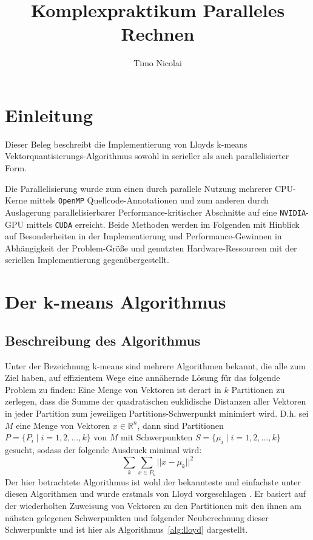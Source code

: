 \documentclass[
    bibliography=totoc, cd=lightcolor, cdmath=false, ngerman]{tudscrreprt}
\begin{document}
\title{Komplexpraktikum Paralleles Rechnen}

\author{
  Timo Nicolai
}


\headingsvskip=-100pt

\maketitle
\tableofcontents
\pagebreak

\chapter{Einleitung}
Dieser Beleg beschreibt die Implementierung von Lloyds k-means
Vektorquantisierungs-Algorithmus sowohl in serieller als auch parallelisierter
Form.

Die Parallelisierung wurde zum einen durch parallele Nutzung mehrerer CPU-Kerne
mittels \texttt{OpenMP} Quellcode-Annotationen und zum anderen durch
Auslagerung parallelisierbarer Performance-kritischer Abschnitte auf eine
\texttt{NVIDIA}-GPU mittels \texttt{CUDA} erreicht. Beide Methoden werden im
Folgenden mit Hinblick auf Besonderheiten in der Implementierung und
Performance-Gewinnen in Abhängigkeit der Problem-Größe und genutzten
Hardware-Ressourcen mit der seriellen Implementierung gegenübergestellt.

\chapter{Der k-means Algorithmus}

\section{Beschreibung des Algorithmus}

Unter der Bezeichnung k-means sind mehrere Algorithmen bekannt, die alle zum
Ziel haben, auf effizientem Wege eine annähernde Lösung für das folgende Problem
zu finden:
\bigbreak
Eine Menge von Vektoren ist derart in $k$ Partitionen zu zerlegen, dass die
Summe der quadratischen euklidische Distanzen aller Vektoren in jeder Partition
zum jeweiligen Partitions-Schwerpunkt minimiert wird. D.h. sei $M$ eine Menge
von Vektoren $x \in \mathbb{R}^n$, dann sind Partitionen $P = \{P_i \mid i =
1,2,\dots,k\}$ von $M$ mit Schwerpunkten $S = \{\mu_i \mid i = 1, 2, \dots,
k\}$ gesucht, sodass der folgende Ausdruck minimal wird:
$$
\sum_{k} \sum_{x \in P_k} ||x - \mu_k||^2
$$
Der hier betrachtete Algorithmus ist wohl der bekannteste und einfachste unter
diesen Algorithmen und wurde erstmals von Lloyd vorgeschlagen \cite{bib:lloyd}.
Er basiert auf der wiederholten Zuweisung von Vektoren zu den Partitionen mit
den ihnen am nähsten gelegenen Schwerpunkten und folgender Neuberechnung dieser
Schwerpunkte und ist hier als Algorithmus~\ref{alg:lloyd} dargestellt.
\end{document}

